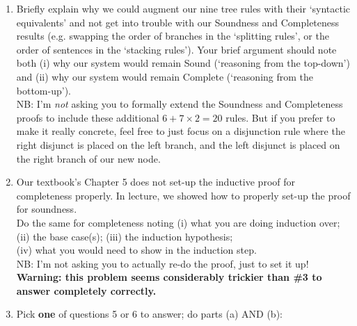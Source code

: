 \documentclass[12pt]{article}
\begin{document}
\begin{enumerate}
\item Briefly explain why we could augment our nine tree rules with their `syntactic equivalents' and not get into trouble with our Soundness and Completeness results (e.g. swapping the order of branches in the `splitting rules', or the order of sentences in the `stacking rules'). Your brief argument should note both (i) why our system would remain Sound (`reasoning from the top-down') and (ii) why our system would remain Complete (`reasoning from the bottom-up'). \\ NB: I'm \textit{not} asking you to formally extend the Soundness and Completeness proofs to include these additional $6+ 7 \times 2 = 20$ rules. But if you prefer to make it really concrete, feel free to just focus on a disjunction rule where the right disjunct is placed on the left branch, and the left disjunct is placed on the right branch of our new node. 

\item Our textbook's Chapter 5 does not set-up the inductive proof for completeness properly. In lecture, we showed how to properly set-up the proof for soundness. \\ Do the same for completeness noting (i) what you are doing induction over; \\ (ii) the base case(s); (iii) the induction hypothesis; \\ (iv) what you would need to show in the induction step. \\ NB: I'm not asking you to actually re-do the proof, just to set it up! \\ \textbf{Warning: this problem seems considerably trickier than \#3 to answer completely correctly.}




\newpage


\item[] \begin{center} Pick \textbf{one} of questions 5 or 6 to answer; do parts (a) AND (b): \end{center}


\end{enumerate}
\end{document}
